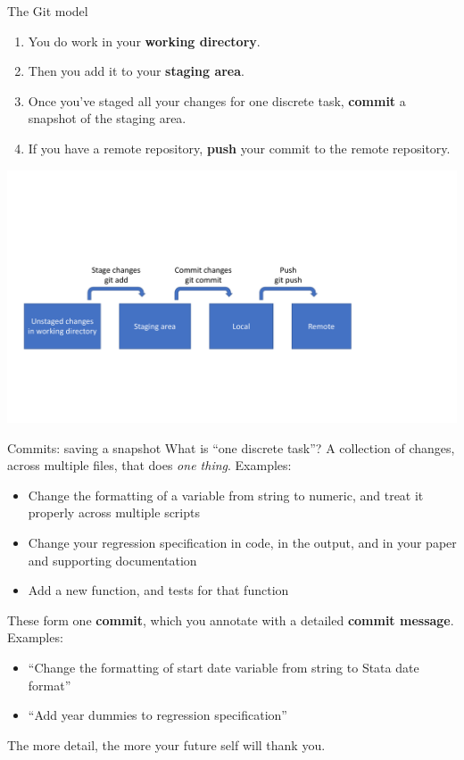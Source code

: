 \documentclass{beamer}
\begin{document}
\begin{frame}{The Git model}

\begin{enumerate}
\item You do work in your \textbf{working directory}.
\item Then you add it to your \textbf{staging area}.
\item Once you've staged all your changes for one discrete task, \textbf{commit} a snapshot of the staging area.
\item If you have a remote repository, \textbf{push} your commit to the remote repository.
\end{enumerate}

\includegraphics[width=\textwidth]{git-model.pdf}
\end{frame}


\begin{frame}{Commits: saving a snapshot}
What is ``one discrete task''? A collection of changes, across multiple files, that does \textit{one thing}. Examples:
\begin{itemize}
\item Change the formatting of a variable from string to numeric, and treat it properly across multiple scripts
\item Change your regression specification in code, in the output, and in your paper and supporting documentation
\item Add a new function, and tests for that function
\end{itemize}
These form one \textbf{commit}, which you annotate with a detailed \textbf{commit message}. Examples:
\begin{itemize}
\item ``Change the formatting of start date variable from string to Stata date format''
\item ``Add year dummies to regression specification''
\end{itemize}
The more detail, the more your future self will thank you.
\end{frame}
\end{document}

